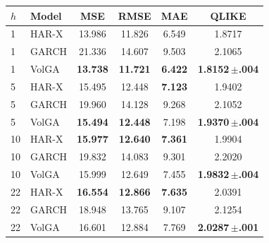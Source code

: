 \begin{tabular}{llcccc}
\toprule
$h$ & Model & MSE & RMSE & MAE & QLIKE \\
\midrule
1 & HAR-X & 13.986 & 11.826 & 6.549 & 1.8717 \\
1 & GARCH & 21.336 & 14.607 & 9.503 & 2.1065 \\
1 & VolGA & \textbf{13.738} & \textbf{11.721} & \textbf{6.422} & \textbf{1.8152\,$\pm$.004} \\
\midrule
5 & HAR-X & 15.495 & 12.448 & \textbf{7.123} & 1.9402 \\
5 & GARCH & 19.960 & 14.128 & 9.268 & 2.1052 \\
5 & VolGA & \textbf{15.494} & \textbf{12.448} & 7.198 & \textbf{1.9370\,$\pm$.004} \\
\midrule
10 & HAR-X & \textbf{15.977} & \textbf{12.640} & \textbf{7.361} & 1.9904 \\
10 & GARCH & 19.832 & 14.083 & 9.301 & 2.2020 \\
10 & VolGA & 15.999 & 12.649 & 7.455 & \textbf{1.9832\,$\pm$.004} \\
\midrule
22 & HAR-X & \textbf{16.554} & \textbf{12.866} & \textbf{7.635} & 2.0391 \\
22 & GARCH & 18.948 & 13.765 & 9.107 & 2.1254 \\
22 & VolGA & 16.601 & 12.884 & 7.769 & \textbf{2.0287\,$\pm$.001} \\
\bottomrule
\end{tabular}
